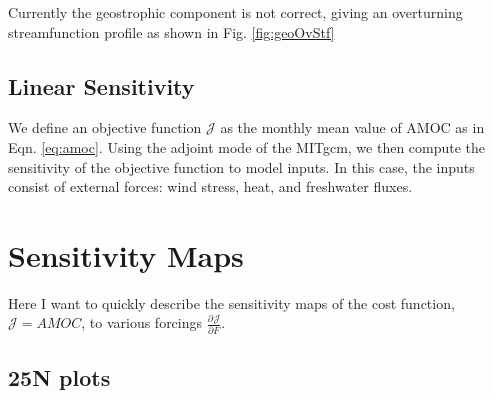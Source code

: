 \documentclass[a4paper,11pt]{article}
\newcommand{\pderiv}[3][]{%
  \ensuremath{\frac{\partial^{#1} {#2}}{\partial {#3}^{#1}}}}
\begin{document}
    Currently the geostrophic component is not correct, giving an overturning streamfunction profile as shown in Fig. \ref{fig:geoOvStf}
    

   
  \subsection{Linear Sensitivity}
  \label{linearSensitivity}
  
  We define an objective function $\mathcal{J}$ as the monthly mean value of AMOC as in Eqn. \ref{eq:amoc}. Using the adjoint mode of the MITgcm, we then compute the sensitivity of the objective function to model inputs. In this case, the inputs consist of external forces: wind stress, heat, and freshwater fluxes. 
  

 \section{Sensitivity Maps}

  Here I want to quickly describe the sensitivity maps of the cost function, $\mathcal{J} = AMOC$, to various forcings $\pderiv{\mathcal{J}}{F}$. 

    \subsection{25N plots}
\end{document}
